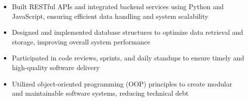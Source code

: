 \par\bigskip
{}
\par\smallskip
\begin{minipage}{13.75cm}
  \begin{minipage}{6.5cm}
    \begin{itemize}
      \item Built RESTful APIs and integrated backend services using Python and JavaScript, ensuring efficient data handling and system scalability
      \item Designed and implemented database structures to optimize data retrieval and storage, improving overall system performance
    \end{itemize}
  \end{minipage}
  \hfill
  \begin{minipage}{6.5cm}
    \begin{itemize}
      \item Participated in code reviews, sprints, and daily standups to ensure timely and high-quality software delivery
      \item Utilized object-oriented programming (OOP) principles to create modular and maintainable software systems, reducing technical debt
    \end{itemize}
  \end{minipage}
\end{minipage}
\par\smallskip
\divider

